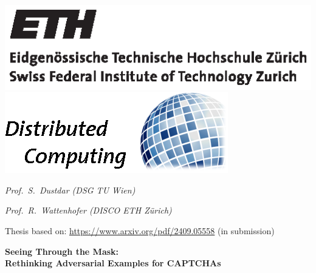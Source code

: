 \documentclass[a4paper,11pt]{article}
\begin{document}
\thispagestyle{empty}

\noindent \hrulefill \vspace{6pt}

\noindent \includegraphics[viewport=8 8 185 55]{figures/eth_logo_black} \hfill
\noindent \includegraphics[trim=0 0 2 0]{figures/disco-logo-col} \hspace{-6pt} \vspace{-6pt}

\noindent \hrulefill \vspace{4pt}

 \hfill {\textit{Prof.\ S.\ Dustdar (DSG TU Wien)}}

\noindent \hfill {\textit{Prof.\ R.\ Wattenhofer (DISCO ETH Zürich)}}

\bigskip

\noindent Thesis based on: \url{https://www.arxiv.org/pdf/2409.05558} (in submission)

\vspace{2em}

\noindent \textbf{\LARGE Seeing Through the Mask: \\ Rethinking Adversarial Examples for CAPTCHAs} \bigskip

\bigskip



\end{document}
